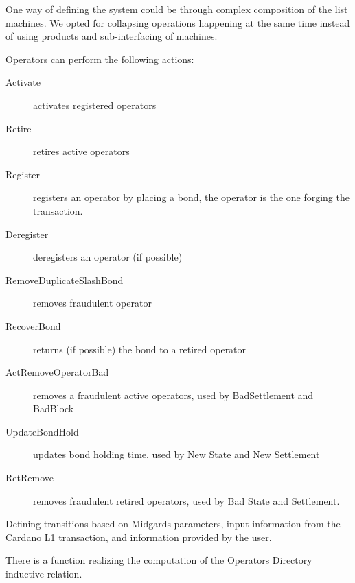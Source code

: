 One way of defining the system could be through complex composition of the list
machines.
%
We opted for collapsing operations happening at the same time instead of using
products and sub-interfacing of machines.

\begin{definition}
  \label{dfn:OperatorDirectory.StateMachine.State.OperActions}
  \leanok
  Operators can perform the following actions:
  \begin{description}
      \item[Activate] activates registered operators 
      \item[Retire] retires active operators 
      \item[Register] registers an operator by placing a bond, the operator is the one forging the transaction.
	  \item[Deregister] deregisters an operator (if possible)
      \item[RemoveDuplicateSlashBond] removes fraudulent operator
	  \item[RecoverBond] returns (if possible) the bond to a retired operator
	  \item[ActRemoveOperatorBad] removes a fraudulent active operators,
		  used by BadSettlement and BadBlock
	  \item[UpdateBondHold] updates bond holding time, used by New State
		  and New Settlement
	  \item[RetRemove] removes fraudulent retired operators, used by Bad
		  State and Settlement.
     \end{description}
  \end{definition}

\begin{definition}
  \label{dfn:OperatorDirectory.Relation}
  \leanok
  Defining transitions based on Midgards parameters, input information from the
	Cardano L1 transaction, and information provided by the user.
  \end{definition}

\begin{theorem}
  \label{thm:OperatorDirectory.Computational.ComputationalRelation}
  \leanok
  There is a function realizing the computation of the Operators Directory
  inductive relation.
  \end{theorem}

